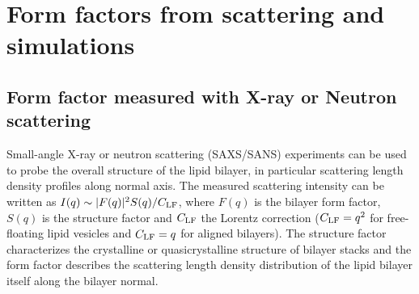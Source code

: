 \documentclass[aps,prl,superscriptaddress,twocolumn]{revtex4}
\begin{document}


\section{Form factors from scattering and simulations}


\subsection{Form factor measured with X-ray or Neutron scattering}

Small-angle X-ray or neutron scattering (SAXS/SANS) experiments can be used to
probe the overall structure of the lipid bilayer, in particular scattering length density profiles along normal axis.
The measured scattering intensity can be written as 
$I(q)\sim|F(q)|^2S(q) / C_{{\rm LF}}$, where $F(q)$ is the bilayer form 
factor, $S(q)$ is the structure factor and $C_{{\rm LF}}$ the Lorentz correction ($C_{{\rm LF}} = q^2$ 
for free-floating lipid vesicles and $C_{{\rm LF}}=q$ for aligned bilayers). 
The structure factor characterizes the crystalline or quasicrystalline structure of bilayer 
stacks and the form factor describes the scattering length density distribution of the lipid bilayer 
itself along the bilayer normal. 
\end{document}
